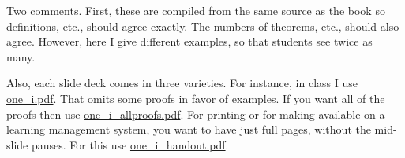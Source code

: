 \documentclass[11pt]{article}
\begin{document}
Two comments.
First, these are compiled from the same source as the book so
definitions, etc., should agree exactly.
The numbers of theorems, etc., should also agree.
However, here I give different examples, so that
students see twice as many.

Also, each slide deck comes in three varieties.
For instance, in class I use \href{file:one/one_i.pdf}{one\_i.pdf}.
That omits some proofs in favor of examples. 
If you want all of
the proofs then use \href{file:one/one_i_allproofs.pdf}{one\_i\_allproofs.pdf}.
For printing or for making available on 
a learning management system, you want to have just full pages, without
the mid-slide pauses. 
For this use 
\href{file:one/one_i_handout.pdf}{one\_i\_handout.pdf}.
\end{document}
